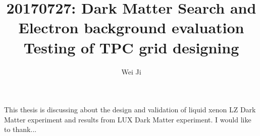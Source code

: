 \documentclass{report}
\begin{document}
\title{20170727: Dark Matter Search and Electron background evaluation\\
            Testing of TPC grid designing}
\author{Wei Ji}
\fourthreader{} %
%
 
\beforepreface
{}
This thesis is discussing about the design and validation of liquid xenon LZ Dark Matter experiment and results from LUX Dark Matter experiment.   
I would like to thank...
\afterpreface
 
















\appendix






%
%

\printbibliography[heading=bibintoc]
\end{document}
